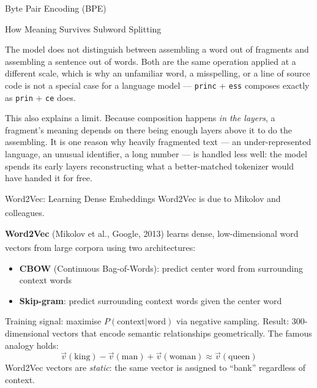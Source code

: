 \begin{v3topic}{Byte Pair Encoding (BPE)}
\begin{v3topic}{How Meaning Survives Subword Splitting}
\begin{plainlanguage}
The model does not distinguish between assembling a word out of fragments and
assembling a sentence out of words. Both are the same operation applied at a
different scale, which is why an unfamiliar word, a misspelling, or a line of
source code is not a special case for a language model --- \texttt{princ} +
\texttt{ess} composes exactly as \texttt{prin} + \texttt{ce} does.
\end{plainlanguage}

\begin{engineernote}
This also explains a limit. Because composition happens \emph{in the layers},
a fragment's meaning depends on there being enough layers above it to do the
assembling. It is one reason why heavily fragmented text --- an
under-represented language, an unusual identifier, a long number --- is handled
less well: the model spends its early layers reconstructing what a
better-matched tokenizer would have handed it for free.
\end{engineernote}
\end{v3topic}

\begin{v3topic}{Word2Vec: Learning Dense Embeddings}
    Word2Vec is due to Mikolov and
    colleagues\textsuperscript{\cite{mikolovEfficientEstimationWord2013}}.

    \textbf{Word2Vec} (Mikolov et al., Google, 2013) learns dense, low-dimensional word vectors from large corpora using two architectures\textsuperscript{\cite[][p.~36]{farrisHowLargeLanguage2025}}:
    \begin{itemize}
        \item \textbf{CBOW} (Continuous Bag-of-Words): predict center word from surrounding context words
        \item \textbf{Skip-gram}: predict surrounding context words given the center word
    \end{itemize}
    Training signal: maximise $P(\text{context}|\text{word})$ via negative sampling.
    Result: 300-dimensional vectors that encode semantic relationships geometrically.
    The famous analogy holds:
    \begin{equation}
        \vec{v}(\text{king}) - \vec{v}(\text{man}) + \vec{v}(\text{woman}) \approx \vec{v}(\text{queen})
    \end{equation}
    Word2Vec vectors are \emph{static}: the same vector is assigned to ``bank'' regardless of context.


\end{v3topic}
\end{v3topic}
